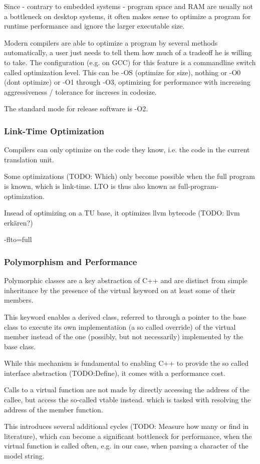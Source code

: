 Since - contrary to embedded systems - program space and RAM are usually not a bottleneck on desktop systems, it often makes sense to optimize a program for runtime performance and ignore the larger executable size.

Modern compilers are able to optimize a program by several methods automatically, a user just needs to tell them how much of a tradeoff he is willing to take. The configuration (e.g. on GCC) for this feature is a commandline switch called optimization level. This can be -OS (optimize for size), nothing or -O0 (dont optimize) or -O1 through -O3, optimizing for performance with increasing aggressiveness / tolerance for increses in codesize.

The standard mode for release software is -O2.

\subsubsection{Link-Time Optimization}
Compilers can only optimize on the code they know, i.e. the code in the current translation unit.

Some optimizations (TODO: Which) only become possible when the full program is known, which is link-time. LTO is thus also known as full-program-optimization.

Insead of optimizing on a TU base, it optimizes llvm bytecode (TODO: llvm erkären?)

-flto=full


\subsubsection{Polymorphism and Performance}
Polymorphic classes are a key abstraction of C++ and are distinct from simple inheritance by the presence of the virtual keyword on at least some of their members.

This keyword enables a derived class, referred to through a pointer to the base class to execute its own implementation (a so called override) of the virtual member instead of the one (possibly, but not necessarily) implemented by the base class.

While this mechanism is fundamental to enabling C++ to provide the so called interface abstraction (TODO:Define), it comes with a performance cost.

Calls to a virtual function are not made by directly accessing the address of the callee, but access the so-called vtable instead. which is tasked with resolving the address of the member function.

This introduces several additional cycles (TODO: Measure how many or find in literature), which can become a significant bottleneck for performance, when the virtual function is called often, e.g. in our case, when parsing a character of the model string.

